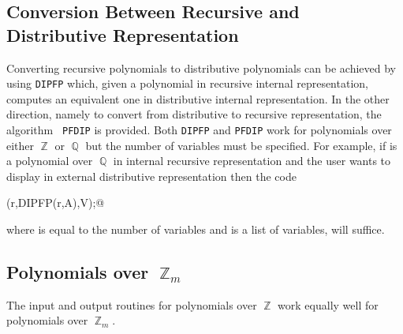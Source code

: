 \subsection{Conversion Between Recursive and Distributive\protect\newline
            Representation}
Converting recursive polynomials to distributive polynomials can be
achieved by using {\tt DIPFP} which, given a polynomial in recursive
internal representation, computes an equivalent one in distributive
internal representation.  In the other direction, namely to convert
from distributive to recursive representation, the algorithm {\tt
PFDIP} is provided. Both {\tt DIPFP} and {\tt PFDIP} work for
polynomials over either $\BbbZ$ or $\BbbQ$ but the number of variables
must be specified.  For example, if \verb@A@ is a polynomial over
$\BbbQ$ in internal recursive representation and the user wants to
display \verb@A@ in external distributive representation then the code
\begin{center}
\verb@DIRPWRITE(r,DIPFP(r,A),V);@ 
\end{center}
where \verb@r@ is equal to the number of variables and \verb@V@ is a
list of \verb@r@ variables, will suffice.  

\subsection{Polynomials over $\BbbZ_m$}
The input and output routines for polynomials over $\BbbZ$ work
equally well for polynomials over $\BbbZ_m$.
